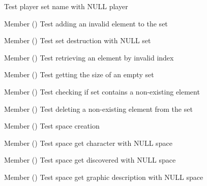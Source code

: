 \begin{DoxyRefList}
%
Test player set name with NULL player  
\item[Member \doxylink{set__test_8c_a8f373a2609fb5770b0663e26df0cb7c4}{test2\+\_\+set\+\_\+add\+\_\+id} ()]\label{test__test000105}%
%
Test adding an invalid element to the set  
\item[Member \doxylink{set__test_8h_a8418524584e638fc6f2d03f726db61f1}{test2\+\_\+set\+\_\+destroy} ()]\label{test__test000103}%
%
Test set destruction with NULL set  
\item[Member \doxylink{set__test_8c_af868199a6847e38eab42e8363181f0ee}{test2\+\_\+set\+\_\+get\+\_\+id\+\_\+from\+\_\+index} ()]\label{test__test000113}%
%
Test retrieving an element by invalid index  
\item[Member \doxylink{set__test_8h_aaadf761f34e98a3a6d214cc2598ee852}{test2\+\_\+set\+\_\+get\+\_\+num\+\_\+ids} ()]\label{test__test000111}%
%
Test getting the size of an empty set  
\item[Member \doxylink{set__test_8c_a27ba936110dfc23be0d0d3b9ebf07161}{test2\+\_\+set\+\_\+has\+\_\+id} ()]\label{test__test000109}%
%
Test checking if set contains a non-\/existing element  
\item[Member \doxylink{set__test_8c_ae89af247bc1f5811ae037774e1920ff7}{test2\+\_\+set\+\_\+remove\+\_\+id} ()]\label{test__test000107}%
%
Test deleting a non-\/existing element from the set  
\item[Member \doxylink{space__test_8c_a012cd3cf37a8d91e2d7098a264c29d65}{test2\+\_\+space\+\_\+create} ()]\label{test__test000115}%
%
Test space creation  
\item[Member \doxylink{space__test_8c_a265ce3822740dbbd82b847437ff415ea}{test2\+\_\+space\+\_\+get\+\_\+character} ()]\label{test__test000143}%
%
Test space get character with NULL space  
\item[Member \doxylink{space__test_8c_a64ea5465e55d87db62b95d88d6ecfb69}{test2\+\_\+space\+\_\+get\+\_\+discovered} ()]\label{test__test000137}%
%
Test space get discovered with NULL space  
\item[Member \doxylink{space__test_8c_a3422f19fd8a821a06ccba2feb52034c2}{test2\+\_\+space\+\_\+get\+\_\+gdesc} ()]\label{test__test000135}%
%
Test space get graphic description with NULL space  

\end{DoxyRefList}

